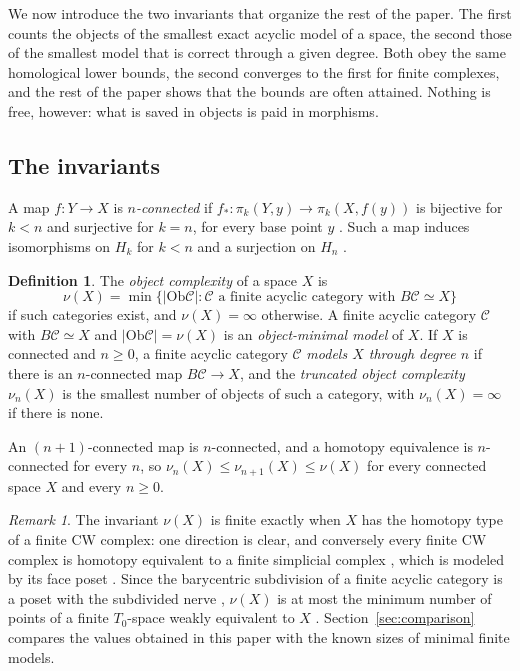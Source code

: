 \documentclass[12pt]{amsart}
\theoremstyle{definition}
\newtheorem{definition}[teo]{Definition}
\theoremstyle{remark}
\newtheorem{remark}[teo]{Remark}
\newcommand{\CC}{\mathcal{C}}
\newcommand{\co}{\colon}
\newcommand{\Ob}{\mathrm{Ob}}
\begin{document}
We now introduce the two invariants that organize the rest of the paper. The first counts the objects of the smallest exact acyclic model of a space, the second those of the smallest model that is correct through a given degree. Both obey the same homological lower bounds, the second converges to the first for finite complexes, and the rest of the paper shows that the bounds are often attained. Nothing is free, however: what is saved in objects is paid in morphisms.

\subsection{The invariants}\label{subsec:nu}\label{subsec:nu-n}

A map $f\co Y\to X$ is \emph{$n$-connected} if $f_*\co\pi_k(Y,y)\to\pi_k(X,f(y))$ is bijective for $k<n$ and surjective for $k=n$, for every base point $y$ \cite[Section~4.1]{Hatcher2002}. Such a map induces isomorphisms on $H_k$ for $k<n$ and a surjection on $H_n$ \cite[Section~4.2]{Hatcher2002}.

\begin{definition}\label{def:nu}\label{def:nu-n}
The \emph{object complexity} of a space $X$ is
\[
\nu(X)=\min\{|\Ob\CC| : \CC \text{ a finite acyclic category with } B\CC\simeq X\}
\]
if such categories exist, and $\nu(X)=\infty$ otherwise. A finite acyclic category $\CC$ with $B\CC\simeq X$ and $|\Ob\CC|=\nu(X)$ is an \emph{object-minimal model} of $X$. If $X$ is connected and $n\ge0$, a finite acyclic category $\CC$ \emph{models $X$ through degree $n$} if there is an $n$-connected map $B\CC\to X$, and the \emph{truncated object complexity} $\nu_n(X)$ is the smallest number of objects of such a category, with $\nu_n(X)=\infty$ if there is none.
\end{definition}

An $(n+1)$-connected map is $n$-connected, and a homotopy equivalence is $n$-connected for every $n$, so $\nu_n(X)\le\nu_{n+1}(X)\le\nu(X)$ for every connected space $X$ and every $n\ge0$.

\begin{remark}\label{rem:nu-finite}
The invariant $\nu(X)$ is finite exactly when $X$ has the homotopy type of a finite CW complex: one direction is clear, and conversely every finite CW complex is homotopy equivalent to a finite simplicial complex \cite[Theorem~2C.5]{Hatcher2002}, which is modeled by its face poset \cite[(10.4), (10.5)]{Kozlov2008}. Since the barycentric subdivision of a finite acyclic category is a poset with the subdivided nerve \cite[Definition~10.10, (10.7)]{Kozlov2008}, $\nu(X)$ is at most the minimum number of points of a finite $T_0$-space weakly equivalent to $X$ \cite{McCord1966}. Section~\ref{sec:comparison} compares the values obtained in this paper with the known sizes of minimal finite models.
\end{remark}
\end{document}
